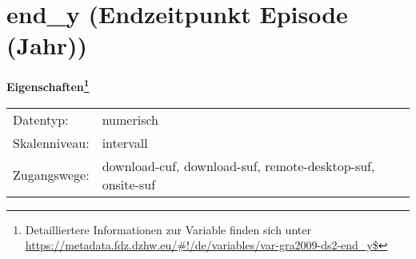 
    \setcounter{footnote}{0}

    \vspace*{-1.8cm}
	\section{end\_y (Endzeitpunkt Episode (Jahr))}
	\label{section:end_y}



    \vspace*{0.5cm}
    \noindent\textbf{Eigenschaften\footnote{Detailliertere Informationen zur Variable finden sich unter
		\url{https://metadata.fdz.dzhw.eu/\#!/de/variables/var-gra2009-ds2-end_y$}}}\\
	\begin{tabularx}{\hsize}{@{}lX}
	Datentyp: & numerisch \\
	Skalenniveau: & intervall \\
	Zugangswege: &
	  download-cuf, 
	  download-suf, 
	  remote-desktop-suf, 
	  onsite-suf
 \\
    \end{tabularx}



